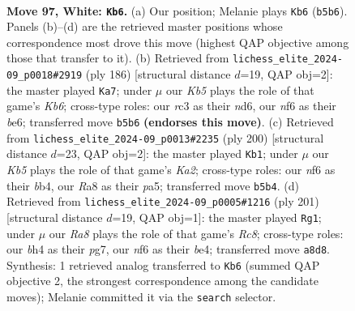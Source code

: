 \documentclass[11pt]{article}
\begin{document}
\clearpage

\begin{figure}[p]\centering
\begin{subfigure}{0.46\textwidth}\centering
\resizebox{\linewidth}{!}{%
\newchessgame
\chessboard[
  setfen={R7/8/5n1p/1K2p3/3p2kb/2r5/8/8 w - - 12 97},
  showmover=false,
  pgfstyle=straightmove, color=movearrow, markmove={b5-b6}
]}
\caption{}
\end{subfigure}\hfill
\begin{subfigure}{0.46\textwidth}\centering
\resizebox{\linewidth}{!}{%
\newchessgame
\chessboard[
  setfen={8/6p1/1K1nb2p/5k2/8/8/8/8 w - - 28 94},
  showmover=false,
  pgfstyle=straightmove, color=movearrow, markmove={b6-a7}
]}
\caption{}
\end{subfigure}
\\[4pt]
\begin{subfigure}{0.46\textwidth}\centering
\resizebox{\linewidth}{!}{%
\newchessgame
\chessboard[
  setfen={5k2/8/7p/pp4p1/1b6/8/K7/8 w - - 12 101},
  showmover=false,
  pgfstyle=straightmove, color=movearrow, markmove={a2-b1}
]}
\caption{}
\end{subfigure}\hfill
\begin{subfigure}{0.46\textwidth}\centering
\resizebox{\linewidth}{!}{%
\newchessgame
\chessboard[
  setfen={3k4/1R4P1/8/4K2p/4B2P/8/8/2r5 b - - 0 101},
  showmover=false,
  pgfstyle=straightmove, color=movearrow, markmove={c1-g1}
]}
\caption{}
\end{subfigure}
\caption{\textbf{Move 97, White: \texttt{Kb6}.} (a) Our position; Melanie plays \texttt{Kb6} (\texttt{b5b6}). Panels (b)--(d) are the retrieved master positions whose correspondence most drove this move (highest QAP objective among those that transfer to it). (b) Retrieved from \texttt{lichess\_elite\_2024-09\_p0018\#2919} (ply 186) [structural distance $d$=19, QAP obj=2]: the master played \texttt{Ka7}; under $\mu$ our \emph{Kb5} plays the role of that game's \emph{Kb6}; cross-type roles: our \emph{r}c3 as their \emph{n}d6, our \emph{n}f6 as their \emph{b}e6; transferred move \texttt{b5b6} \textbf{(endorses this move)}. (c) Retrieved from \texttt{lichess\_elite\_2024-09\_p0013\#2235} (ply 200) [structural distance $d$=23, QAP obj=2]: the master played \texttt{Kb1}; under $\mu$ our \emph{Kb5} plays the role of that game's \emph{Ka2}; cross-type roles: our \emph{n}f6 as their \emph{b}b4, our \emph{R}a8 as their \emph{p}a5; transferred move \texttt{b5b4}. (d) Retrieved from \texttt{lichess\_elite\_2024-09\_p0005\#1216} (ply 201) [structural distance $d$=19, QAP obj=1]: the master played \texttt{Rg1}; under $\mu$ our \emph{Ra8} plays the role of that game's \emph{Rc8}; cross-type roles: our \emph{b}h4 as their \emph{p}g7, our \emph{n}f6 as their \emph{b}e4; transferred move \texttt{a8d8}. Synthesis: 1 retrieved analog transferred to \texttt{Kb6} (summed QAP objective 2, the strongest correspondence among the candidate moves); Melanie committed it via the \texttt{search} selector.}
\label{fig:thought-m192}
\end{figure}
\end{document}
